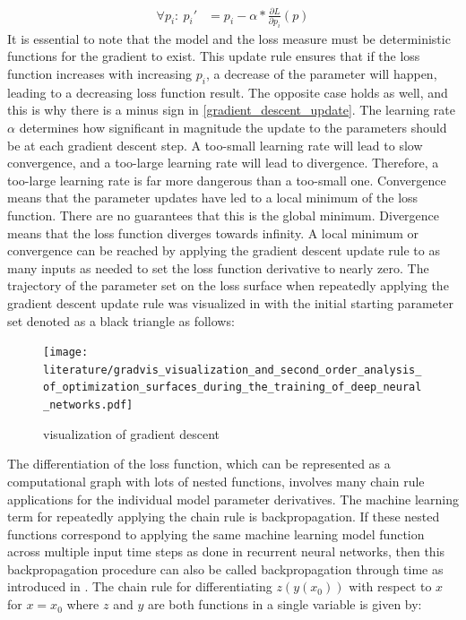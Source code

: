 \documentclass[draft,final]{vutinfth} %
\begin{document}
\begin{align}
\label{gradient_descent_update}
\forall p_i:~p_i' &= p_i - \alpha * \frac{\partial{L}}{\partial{p_i}}(p)
\end{align}
It is essential to note that the model and the loss measure must be deterministic functions for the gradient to exist.
This update rule ensures that if the loss function increases with increasing $p_i$, a decrease of the parameter will happen, leading to a decreasing loss function result.
The opposite case holds as well, and this is why there is a minus sign in \ref{gradient_descent_update}.
The learning rate $\alpha$ determines how significant in magnitude the update to the parameters should be at each gradient descent step.
A too-small learning rate will lead to slow convergence, and a too-large learning rate will lead to divergence.
Therefore, a too-large learning rate is far more dangerous than a too-small one.
Convergence means that the parameter updates have led to a local minimum of the loss function.
There are no guarantees that this is the global minimum. Divergence means that the loss function diverges towards infinity.
A local minimum or convergence can be reached by applying the gradient descent update rule to as many inputs as needed to set the loss function derivative to nearly zero.
The trajectory of the parameter set on the loss surface when repeatedly applying the gradient descent update rule was visualized in \cite[p. 2]{gradient_descent_vis} with the initial starting parameter set denoted as a black triangle as follows:
\begin{figure}[H]
\centering{}
\texttt{[image: literature/gradvis\_visualization\_and\_second\_order\_analysis\_of\_optimization\_surfaces\_during\_the\_training\_of\_deep\_neural\_networks.pdf]}
\caption{visualization of gradient descent}
\label{fig:gradient_descent_vis}
\end{figure}
The differentiation of the loss function, which can be represented as a computational graph with lots of nested functions, involves many chain rule applications for the individual model parameter derivatives. The machine learning term for repeatedly applying the chain rule is backpropagation.
If these nested functions correspond to applying the same machine learning model function across multiple input time steps as done in recurrent neural networks, then this backpropagation procedure can also be called backpropagation through time as introduced in \cite{GradientDescent}.
The chain rule for differentiating $z(y(x_0))$ with respect to $x$ for $x=x_0$ where $z$ and $y$ are both functions in a single variable is given by:
\end{document}
